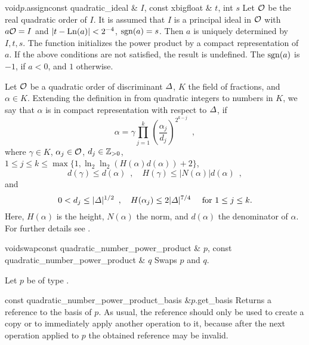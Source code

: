 \begin{fcode}{void}{$p$.assign}{const quadratic_ideal & $I$, const xbigfloat & $t$, int $s$}
  Let $\mathcal{O}$ be the real quadratic order of $I$.  It is assumed that $I$ is a principal ideal in
  $\mathcal{O}$ with $a \mathcal{O} = I$ and $|t - \operatorname{Ln}(a)| < 2^{-4}$, $\operatorname{sgn}(a) = s$.  Then $a$ is uniquely
  determined by $I,t,s$.  The function initializes the power product by a compact representation
  of $a$.  If the above conditions are not satisfied, the result is undefined.  The $\operatorname{sgn}(a)$ is
  $-1$, if $a < 0$, and $1$ otherwise.
  
  Let $\mathcal{O}$ be a quadratic order of discriminant $\varDelta$, $K$ the field of fractions, and
  $\alpha\in K$.  Extending the definition in \cite{Buchmann/Thiel/Williams:1995} from quadratic
  integers to numbers in $K$, we say that $\alpha$ is in compact representation with respect to
  $\varDelta$, if
  \begin{displaymath}
    \alpha = \gamma \prod_{j=1}^k \left(\frac{\alpha_j}{d_j}\right)^{2^{k-j}} \enspace,
  \end{displaymath}
  where $\gamma\in K$, $\alpha_j\in \mathcal{O}$, $d_j\in\mathbb{Z}_{>0}$, $1\leq j\leq k \leq \max\{ 1,
  \ln_2 \ln_2(H(\alpha) d(\alpha))+2 \}$,
  \begin{displaymath}
    d(\gamma) \leq d(\alpha) \enspace, \quad H(\gamma) \leq |N(\alpha)| d(\alpha) \enspace,
  \end{displaymath}
  and
  \begin{displaymath}
    0 < d_j \leq |\varDelta|^{1/2}\enspace, \quad H(\alpha_j) \leq 2|\varDelta|^{7/4} \quad\text{ for } 1 \leq j \leq k .
  \end{displaymath}
  Here, $H(\alpha)$ is the height, $N(\alpha)$ the norm, and $d(\alpha)$ the denominator of
  $\alpha$.  For further details see \cite{Maurer_Thesis:2000}.
\end{fcode}

\begin{fcode}{void}{swap}{const quadratic_number_power_product & $p$,
    const quadratic_number_power_product & $q$}%
  Swaps $p$ and $q$.
\end{fcode}



\ACCS

Let $p$ be of type .

\begin{fcode}{const quadratic_number_power_product_basis &}{$p$.get_basis}{}
  Returns a  reference to the basis of $p$.  As usual, the  reference
  should only be used to create a copy or to immediately apply another operation to it, because
  after the next operation applied to $p$ the obtained reference may be invalid.
\end{fcode}

